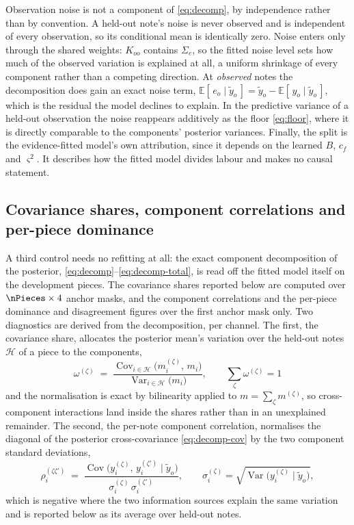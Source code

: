 Observation noise is not a component of \eqref{eq:decomp}, by independence
rather than by convention. A held-out note's noise is never observed and is
independent of every observation, so its conditional mean is identically
zero. Noise enters only through the shared weights: $K_{oo}$ contains
$\Sigma_e$, so the fitted noise level sets how much of the observed variation
is explained at all, a uniform shrinkage of every component rather than a
competing direction. At \emph{observed} notes the decomposition does gain an
exact noise term, $\mathbb{E}[\,e_o \mid \tilde y_o\,] = \tilde y_o -
\mathbb{E}[\,y_o \mid \tilde y_o\,]$, which is the residual the model
declines to explain. In the predictive variance of a held-out observation the
noise reappears additively as the floor \eqref{eq:floor}, where it is
directly comparable to the components' posterior variances. Finally, the
split is the evidence-fitted model's own attribution, since it depends on the
learned $B$, $c_f$ and $\varsigma^2$. It describes how the fitted model
divides labour and makes no causal statement.

\subsection{Covariance shares, component correlations and per-piece dominance}
A third control needs no refitting at all: the exact component decomposition
of the posterior, \eqref{eq:decomp}--\eqref{eq:decomp-total}, is read off
the fitted model itself on the development pieces. The covariance shares
reported below are computed over $\nPieces \times 4$ anchor masks, and the
component correlations and the per-piece dominance and disagreement figures
over the first anchor mask only. Two diagnostics are derived from the
decomposition, per channel. The first, the covariance share, allocates the
posterior mean's variation over the held-out notes $\mathcal{H}$ of a piece
to the components,
\begin{equation}
  \omega^{(\zeta)} \;=\;
  \frac{\operatorname{Cov}_{i \in \mathcal{H}}\bigl(m^{(\zeta)}_i,\, m_i\bigr)}
       {\operatorname{Var}_{i \in \mathcal{H}}\bigl(m_i\bigr)},
  \qquad \sum_\zeta \omega^{(\zeta)} = 1
  \label{eq:share}
\end{equation}
and the normalisation is exact by bilinearity applied to
$m = \sum_\zeta m^{(\zeta)}$, so cross-component interactions land inside the
shares rather than in an unexplained remainder. The second, the per-note
component correlation, normalises the diagonal of the posterior
cross-covariance \eqref{eq:decomp-cov} by the two component standard
deviations,
\begin{equation}
  \rho^{(\zeta\zeta')}_i \;=\;
  \frac{\operatorname{Cov}\bigl(y^{(\zeta)}_i,\, y^{(\zeta')}_i \mid \tilde y_o\bigr)}
       {\sigma^{(\zeta)}_i\, \sigma^{(\zeta')}_i},
  \qquad
  \sigma^{(\zeta)}_i = \sqrt{\operatorname{Var}\bigl(y^{(\zeta)}_i \mid \tilde y_o\bigr)},
  \label{eq:compcorr}
\end{equation}
which is negative where the two information sources explain the same
variation and is reported below as its average over held-out notes.

